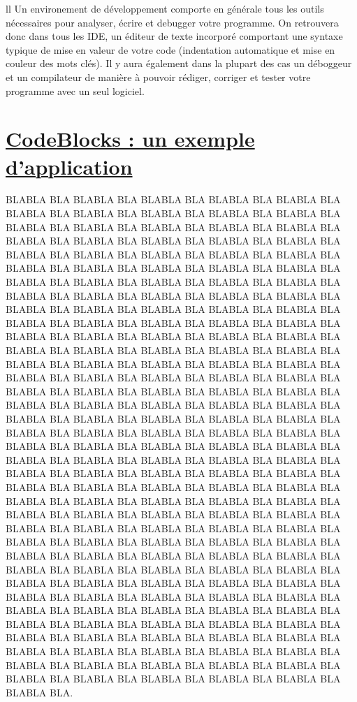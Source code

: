 \documentclass[a4paper, 12pt]{article}
\begin{document}
\begin{doublespace}ll
Un environement de développement comporte en générale tous les outils nécessaires pour analyser, écrire et debugger votre programme. On retrouvera donc dans tous les IDE, un éditeur de texte incorporé comportant une syntaxe typique de mise en valeur de votre code (indentation automatique et mise en couleur des mots clés). Il y aura également dans la plupart des cas un déboggeur et un compilateur de manière à pouvoir rédiger, corriger et tester votre programme avec un seul logiciel.
\end{doublespace}

\newpage \section{\underline{CodeBlocks : un exemple d'application}}

\begin{doublespace}
BLABLA BLA BLABLA BLA BLABLA BLA BLABLA BLA BLABLA BLA BLABLA BLA BLABLA BLA BLABLA BLA BLABLA BLA BLABLA BLA BLABLA BLA BLABLA BLA BLABLA BLA BLABLA BLA BLABLA BLA BLABLA BLA BLABLA BLA BLABLA BLA BLABLA BLA BLABLA BLA BLABLA BLA BLABLA BLA BLABLA BLA BLABLA BLA BLABLA BLA BLABLA BLA BLABLA BLA BLABLA BLA BLABLA BLA BLABLA BLA BLABLA BLA BLABLA BLA BLABLA BLA BLABLA BLA BLABLA BLA BLABLA BLA BLABLA BLA BLABLA BLA BLABLA BLA BLABLA BLA BLABLA BLA BLABLA BLA BLABLA BLA BLABLA BLA BLABLA BLA BLABLA BLA BLABLA BLA BLABLA BLA BLABLA BLA BLABLA BLA BLABLA BLA BLABLA BLA BLABLA BLA BLABLA BLA BLABLA BLA BLABLA BLA BLABLA BLA BLABLA BLA BLABLA BLA BLABLA BLA BLABLA BLA BLABLA BLA BLABLA BLA BLABLA BLA BLABLA BLA BLABLA BLA BLABLA BLA BLABLA BLA BLABLA BLA BLABLA BLA BLABLA BLA BLABLA BLA BLABLA BLA BLABLA BLA BLABLA BLA BLABLA BLA BLABLA BLA BLABLA BLA BLABLA BLA BLABLA BLA BLABLA BLA BLABLA BLA BLABLA BLA BLABLA BLA BLABLA BLA BLABLA BLA BLABLA BLA BLABLA BLA BLABLA BLA BLABLA BLA BLABLA BLA BLABLA BLA BLABLA BLA BLABLA BLA BLABLA BLA BLABLA BLA BLABLA BLA BLABLA BLA BLABLA BLA BLABLA BLA BLABLA BLA BLABLA BLA BLABLA BLA BLABLA BLA BLABLA BLA BLABLA BLA BLABLA BLA BLABLA BLA BLABLA BLA BLABLA BLA BLABLA BLA BLABLA BLA BLABLA BLA BLABLA BLA BLABLA BLA BLABLA BLA BLABLA BLA BLABLA BLA BLABLA BLA BLABLA BLA BLABLA BLA BLABLA BLA BLABLA BLA BLABLA BLA BLABLA BLA BLABLA BLA BLABLA BLA BLABLA BLA BLABLA BLA BLABLA BLA BLABLA BLA BLABLA BLA BLABLA BLA BLABLA BLA BLABLA BLA BLABLA BLA BLABLA BLA BLABLA BLA BLABLA BLA BLABLA BLA BLABLA BLA BLABLA BLA BLABLA BLA BLABLA BLA BLABLA BLA BLABLA BLA BLABLA BLA BLABLA BLA BLABLA BLA BLABLA BLA BLABLA BLA BLABLA BLA BLABLA BLA BLABLA BLA BLABLA BLA BLABLA BLA BLABLA BLA BLABLA BLA BLABLA BLA BLABLA BLA BLABLA BLA BLABLA BLA BLABLA BLA BLABLA BLA BLABLA BLA BLABLA BLA BLABLA BLA BLABLA BLA BLABLA BLA BLABLA BLA BLABLA BLA BLABLA BLA BLABLA BLA BLABLA BLA BLABLA BLA BLABLA BLA BLABLA BLA BLABLA BLA BLABLA BLA BLABLA BLA BLABLA BLA.
\end{doublespace}
\end{document}
